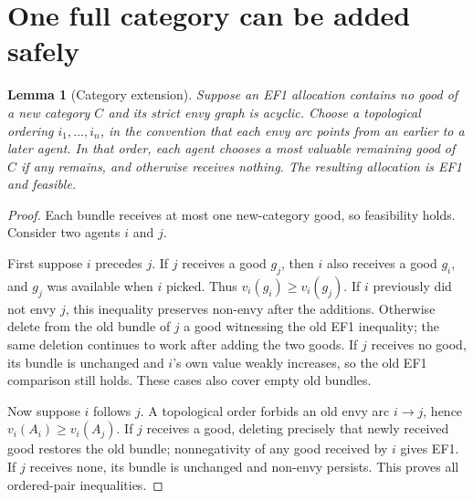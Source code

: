 \documentclass[11pt]{article}
\newtheorem{lemma}[theorem]{Lemma}
\theoremstyle{remark}
\begin{document}
\section{One full category can be added safely}
\begin{lemma}[Category extension]\label{extension}
Suppose an EF1 allocation contains no good of a new category $C$ and its strict envy graph is acyclic. Choose a topological ordering $i_1,\ldots,i_n$, in the convention that each envy arc points from an earlier to a later agent. In that order, each agent chooses a most valuable remaining good of $C$ if any remains, and otherwise receives nothing. The resulting allocation is EF1 and feasible.
\end{lemma}
\begin{proof}
Each bundle receives at most one new-category good, so feasibility holds. Consider two agents $i$ and $j$.

First suppose $i$ precedes $j$. If $j$ receives a good $g_j$, then $i$ also receives a good $g_i$, and $g_j$ was available when $i$ picked. Thus $v_i(g_i)\geq v_i(g_j)$. If $i$ previously did not envy $j$, this inequality preserves non-envy after the additions. Otherwise delete from the old bundle of $j$ a good witnessing the old EF1 inequality; the same deletion continues to work after adding the two goods. If $j$ receives no good, its bundle is unchanged and $i$'s own value weakly increases, so the old EF1 comparison still holds. These cases also cover empty old bundles.

Now suppose $i$ follows $j$. A topological order forbids an old envy arc $i\to j$, hence $v_i(A_i)\geq v_i(A_j)$. If $j$ receives a good, deleting precisely that newly received good restores the old bundle; nonnegativity of any good received by $i$ gives EF1. If $j$ receives none, its bundle is unchanged and non-envy persists. This proves all ordered-pair inequalities.
\end{proof}
\end{document}
